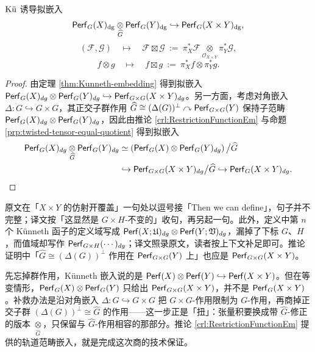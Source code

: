 \begin{crl}
$\Ku$ 诱导拟嵌入
$$
\Perf_G(X)_{\dg}
\underset{\widehat{G}}{\otimes}
\Perf_G(Y)_{\dg}
\hookrightarrow
\Perf_G(X\times Y)_{\dg},
$$
$$
(\mathcal{F},\mathcal{G})
\quad\mapsto\quad
\mathcal{F}\boxtimes\mathcal{G}
~:=~
\pi_X^*\mathcal{F}
\underset{\mathcal{O}_{X\times Y}}{\otimes}
\pi_Y^*\mathcal{G},
$$
$$
f\otimes g
\quad\mapsto\quad
f\boxtimes g
~:=~
\pi_X^*f
\otimes
\pi_Y^*g.
$$
\end{crl}
\begin{proof}
由定理 \ref{thm:Kunneth-embedding} 得到拟嵌入 $\Perf_G (X)_{dg}\otimes\Perf_G(Y)_{dg}\hookrightarrow\Perf_{G\times G} (X\times Y)_{dg}$。另一方面，考虑对角嵌入 $\Delta\colon G\hookrightarrow G\times G$，其正交子群作用 $\widehat{G}\cong (\Delta (G))^{\perp}\curvearrowright\Perf_{G\times G} (Y)$ 保持子范畴 $\Perf_G (X)_{dg}\otimes\Perf_G(Y)_{dg}$，因此由推论 \ref{crl:RestrictionFunctionEm} 与命题 \ref{prp:twisted-tensor-equal-quotient} 得到拟嵌入
\begin{align*}
    \Perf_G (X)_{dg}\underset{\widehat{G}}{\otimes}\Perf_G(Y)_{dg}&\simeq\left(\Perf_G(X)\otimes\Perf_G(Y)_{dg}\right)\big/\widehat{G}\\ 
    &\hookrightarrow\Perf_{G\times G} (X\times Y)_{dg}\big/\widehat{G}\hookrightarrow\Perf_G (X\times Y)_{dg}.\qedhere
\end{align*}
\end{proof}

\begin{yizhu}[原文此处的断句与记号小疵]
原文在「$X\times Y$ 的仿射开覆盖」一句处以逗号接「Then we can define」，句子并不完整；译文按「这显然是 $G\times H$-不变的」收句，再另起一句。此外，定义中第 $n$ 个 Künneth 函子的定义域写成 $\Perf(X;\mathfrak{U})_{dg}\otimes\Perf(Y;\mathfrak{V})_{dg}$，漏掉了下标 $G$、$H$，而值域却写作 $\Perf_{G\times H}(\cdots)_{dg}$；译文照录原文，读者按上下文补足即可。推论证明中「$\widehat{G}\cong(\Delta(G))^\perp$ 作用在 $\Perf_{G\times G}(Y)$ 上」也应是 $\Perf_{G\times G}(X\times Y)$。
\end{yizhu}

\begin{yizhu}[「扭」扭在哪里]
先忘掉群作用，Künneth 嵌入说的是 $\Perf(X)\otimes\Perf(Y)\hookrightarrow\Perf(X\times Y)$。但在等变情形，$\Perf_G(X)\otimes\Perf_G(Y)$ 只给出 $\Perf_{G\times G}(X\times Y)$，并不是 $\Perf_G(X\times Y)$。补救办法是沿对角嵌入 $\Delta\colon G\hookrightarrow G\times G$ 把 $G\times G$-作用限制为 $G$-作用，再商掉正交子群 $(\Delta(G))^\perp\cong\widehat{G}$ 的作用——这一步正是「扭」：张量积要换成带 $\widehat{G}$-修正的版本 $\underset{\widehat{G}}{\otimes}$，只保留与 $\widehat{G}$-作用相容的那部分。推论 \ref{crl:RestrictionFunctionEm} 提供的轨道范畴嵌入，就是完成这次商的技术保证。
\end{yizhu}

